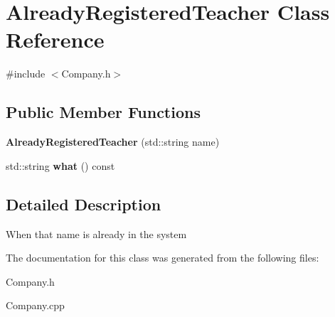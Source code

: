 \hypertarget{class_already_registered_teacher}{}\section{Already\+Registered\+Teacher Class Reference}
\label{class_already_registered_teacher}


{\ttfamily \#include $<$Company.\+h$>$}

\subsection*{Public Member Functions}
\begin{DoxyCompactItemize}
\item 
\mbox{\label{class_already_registered_teacher_ab6bdaf12fd3147274d10f6595d424a8e}} 
{\bfseries Already\+Registered\+Teacher} (std\+::string name)
\item 
\mbox{\label{class_already_registered_teacher_a3d7912fc2aa048ad661db2fa82f17d35}} 
std\+::string {\bfseries what} () const
\end{DoxyCompactItemize}


\subsection{Detailed Description}
When that name is already in the system 

The documentation for this class was generated from the following files\+:\begin{DoxyCompactItemize}
\item 
Company.\+h\item 
Company.\+cpp\end{DoxyCompactItemize}
